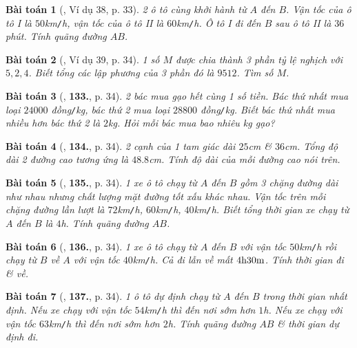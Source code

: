 \documentclass{article}
\numberwithin{equation}{section}
\newtheorem{baitoan}{Bài toán}
\begin{document}
\begin{baitoan}[\cite{Tuyen_Toan_7}, Ví dụ 38, p. 33]
	2 ô tô cùng khởi hành từ $A$ đến $B$. Vận tốc của ô tô I là $50$\emph{km\texttt{/}h}, vận tốc của ô tô II là $60$\emph{km\texttt{/}h}. Ô tô I đi đến $B$ sau ô tô II là $36$ phút. Tính quãng đường $AB$.
\end{baitoan}

\begin{baitoan}[\cite{Tuyen_Toan_7}, Ví dụ 39, p. 34]
	1 số $M$ được chia thành 3 phần tỷ lệ nghịch với $5,2,4$. Biết tổng các lập phương của 3 phần đó là $9512$. Tìm số $M$.
\end{baitoan}

\begin{baitoan}[\cite{Tuyen_Toan_7}, \textbf{133.}, p. 34]
	2 bác mua gạo hết cùng 1 số tiền. Bác thứ nhất mua loại $24000$ \emph{đồng\texttt{/}kg}, bác thứ 2 mua loại $28800$ \emph{đồng\texttt{/}kg}. Biết bác thứ nhất mua nhiều hơn bác thứ 2 là $2$\emph{kg}. Hỏi mỗi bác mua bao nhiêu \emph{kg} gạo?
\end{baitoan}

\begin{baitoan}[\cite{Tuyen_Toan_7}, \textbf{134.}, p. 34]
	2 cạnh của 1 tam giác dài $25$\emph{cm} \& $36$\emph{cm}. Tổng độ dài 2 đường cao tương ứng là $48.8$\emph{cm}. Tính độ dài của mỗi đường cao nói trên.
\end{baitoan}

\begin{baitoan}[\cite{Tuyen_Toan_7}, \textbf{135.}, p. 34]
	1 xe ô tô chạy từ $A$ đến $B$ gồm 3 chặng đường dài như nhau nhưng chất lượng mặt đường tốt xấu khác nhau. Vận tốc trên mỗi chặng đường lần lượt là $72$\emph{km\texttt{/}h}, $60$\emph{km\texttt{/}h}, $40$\emph{km\texttt{/}h}. Biết tổng thời gian xe chạy từ $A$ đến $B$ là $4$\emph{h}. Tính quãng đường $AB$.
\end{baitoan}

\begin{baitoan}[\cite{Tuyen_Toan_7}, \textbf{136.}, p. 34]	
	1 xe ô tô chạy từ $A$ đến $B$ với vận tốc $50$\emph{km\texttt{/}h} rồi chạy từ $B$ về $A$ với vận tốc $40$\emph{km\texttt{/}h}. Cả đi lẫn về mất $\rm4h30m$. Tính thời gian đi \& về.
\end{baitoan}

\begin{baitoan}[\cite{Tuyen_Toan_7}, \textbf{137.}, p. 34]
	1 ô tô dự định chạy từ $A$ đến $B$ trong thời gian nhất định. Nếu xe chạy với vận tốc $54$\emph{km\texttt{/}h} thì đến nơi sớm hơn $1$\emph{h}. Nếu xe chạy với vận tốc $63$\emph{km\texttt{/}h} thì đến nơi sớm hơn $2$\emph{h}. Tính quãng đường $AB$ \& thời gian dự định đi.
\end{baitoan}
\end{document}
